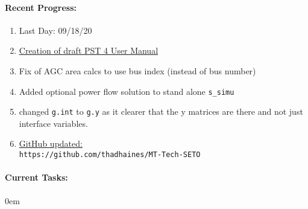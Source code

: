 \documentclass[12pt]{article}
\begin{document}
\begin{multicols}{2}
\raggedright

\paragraph{Recent Progress:}

	\begin{enumerate}
	\item Last Day: 09/18/20
		\item \href{https://github.com/thadhaines/MT-Tech-SETO/blob/master/researchDocs/TEX/PST4UserManual/template/PST4UserManual.pdf}{Creation of draft PST 4 User Manual}
		\item Fix of AGC area calcs to use bus index (instead of bus number)
		\item Added optional power flow solution to stand alone \verb|s_simu|
		\item changed \verb|g.int| to \verb|g.y| as it clearer that the y matrices are there and not just interface variables.

		
	
		\item \href{https://github.com/thadhaines/MT-Tech-SETO}{GitHub updated:}\\
	{\footnotesize \verb|https://github.com/thadhaines/MT-Tech-SETO| }\\
	\end{enumerate}

\paragraph{Current Tasks:}
\begin{enumerate}
	\itemsep 0em 


\end{enumerate}
\end{multicols}
\end{document}
